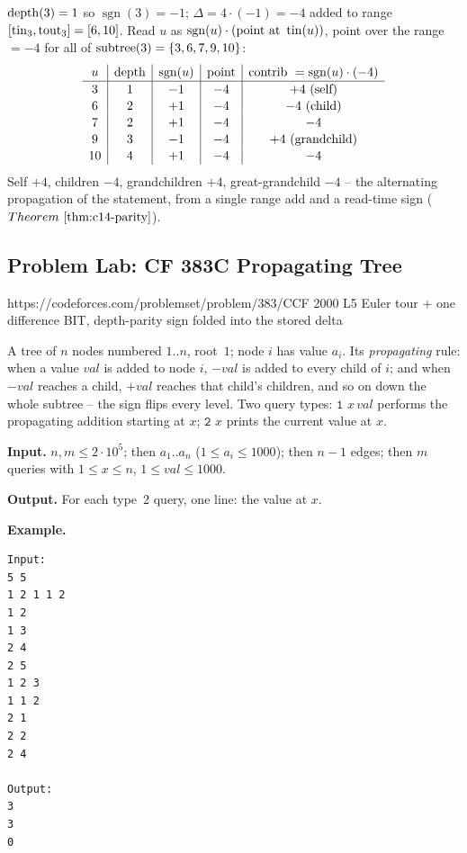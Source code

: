 \begin{tracebox}
\(\operatorname{depth}(3)=1\) so \(\operatorname{sgn}(3)=-1\); \(\Delta=4\cdot(-1)=-4\) added
to range \([\operatorname{tin}_3,\operatorname{tout}_3]=[6,10]\).  Read \(u\) as
\(\operatorname{sgn}(u)\cdot(\text{point at }\operatorname{tin}(u))\), point over the range
\(=-4\) for all of \(\operatorname{subtree}(3)=\{3,6,7,9,10\}\):
\[
\renewcommand{\arraystretch}{1.1}
\begin{array}{c|c|c|c|c}
u & \depth & \operatorname{sgn}(u) & \text{point} & \text{contrib }=\operatorname{sgn}(u)\cdot(-4)\\ \hline
3 & 1 & -1 & -4 & +4\ (\text{self})\\
6 & 2 & +1 & -4 & -4\ (\text{child})\\
7 & 2 & +1 & -4 & -4\\
9 & 3 & -1 & -4 & +4\ (\text{grandchild})\\
10& 4 & +1 & -4 & -4
\end{array}
\]
Self \(+4\), children \(-4\), grandchildren \(+4\), great-grandchild \(-4\) --
the alternating propagation of the statement, from a single range add and a
read-time sign (\(\thmref{c14-parity}\)).
\end{tracebox}

\subsection{Problem Lab: CF 383C Propagating Tree}

  {https://codeforces.com/problemset/problem/383/C}{CF 2000 L5}
  {Euler tour + one difference BIT, depth-parity sign folded into the stored delta}

\begin{problemstatement}
A tree of \(n\) nodes numbered \(1..n\), root~\(1\); node \(i\) has value
\(a_i\).  Its \emph{propagating} rule: when a value \(\mathit{val}\) is added
to node \(i\), \(-\mathit{val}\) is added to every child of \(i\); and when
\(-\mathit{val}\) reaches a child, \(+\mathit{val}\) reaches that child's
children, and so on down the whole subtree -- the sign flips every level.
Two query types: \(\texttt{1 }x\,\mathit{val}\) performs the propagating
addition starting at \(x\); \(\texttt{2 }x\) prints the current value at \(x\).

\textbf{Input.} \(n,m\le 2\cdot10^5\); then \(a_1..a_n\) (\(1\le a_i\le1000\));
then \(n-1\) edges; then \(m\) queries with \(1\le x\le n\), \(1\le\mathit{val}\le1000\).

\textbf{Output.} For each type~2 query, one line: the value at \(x\).

\textbf{Example.}
\begin{verbatim}
Input:
5 5
1 2 1 1 2
1 2
1 3
2 4
2 5
1 2 3
1 1 2
2 1
2 2
2 4

Output:
3
3
0
\end{verbatim}
\end{problemstatement}

